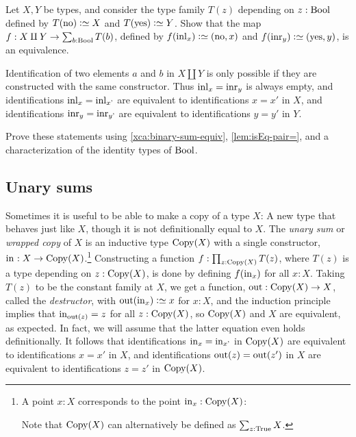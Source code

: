 \begin{xca}\label{xca:binary-sum-equiv}
  Let $X,Y$ be types, and consider the type family
  $T(z)$ depending on $z:\mathrm{Bool}$ defined by
  $T(\no)\defeq X$ and $T(\yes) \defeq Y$.
  Show that the map $f : X\amalg Y \to \sum_{b:\mathrm{Bool}}T(b)$,
  defined by $f (\inl x) \defeq (\no,x)$ and $f(\inr y) \defeq (\yes,y)$,
  is an equivalence.
\end{xca}

Identification of two elements $a$ and $b$ in $X \amalg Y$ is
only possible if they are constructed with the same constructor.
Thus $\inl{x} = \inr{y}$ is always empty, and identifications
$\inl{x} = \inl{x'}$ are equivalent to identifications $x=x'$ in $X$,
and identifications
$\inr{y} = \inr{y'}$ are equivalent to identifications $y=y'$ in $Y$.

\begin{xca}\label{xca:binary-sum-id}
  Prove these statements using \cref{xca:binary-sum-equiv},
  \cref{lem:isEq-pair=}, and a characterization
  of the identity types of $\mathrm{Bool}$.
\end{xca}

\subsection{Unary sums}\label{sec:unary-sum-types}

Sometimes it is useful to be able to make a copy of a type $X$:
A new type that behaves just like $X$,
though it is not definitionally equal to $X$.
The \emph{unary sum} or \emph{wrapped copy} of $X$ is an inductive type $\Copy(X)$
with a single constructor, $\inc{} : X \to \Copy(X)$.\footnote{%
  A point $x:X$ corresponds to the point $\inc{x}:\Copy(X)$:\par
  \par
  \noindent Note that $\Copy(X)$ can alternatively be defined as $\sum_{z:\mathrm{True}}X$.}
Constructing a function $f : \prod_{z:\Copy(X)}T(z)$,
where $T(z)$ is a type depending on $z : \Copy(X)$,
is done by defining $f(\inc{x})$ for all $x:X$.
Taking $T(z)$ to be the constant family at $X$,
we get a function, $\out : \Copy(X) \to X$,
called the \emph{destructor},
with $\out(\inc{x}) \defeq x$ for $x:X$,
and the induction principle implies that $\inc{\out(z)} = z$
for all $z:\Copy(X)$, so $\Copy(X)$ and $X$ are equivalent, as expected.
In fact, we will assume that the latter equation even holds definitionally.
It follows that identifications $\inc{x}=\inc{x'}$ in $\Copy(X)$ are equivalent
to identifications $x=x'$ in $X$, and identifications $\out(z)=\out(z')$ in $X$
are equivalent to identifications $z=z'$ in $\Copy(X)$.

